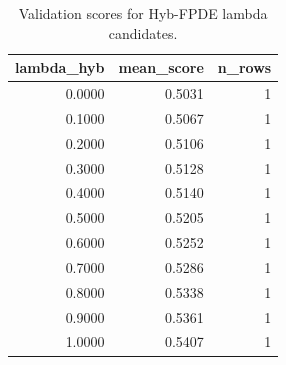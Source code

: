 \begin{table}[t]
\caption{Validation scores for Hyb-FPDE lambda candidates.}
\label{tab:lambda_distribution_computed}
\centering
\begin{tabular}{rrr}
\toprule
lambda\_hyb & mean\_score & n\_rows \\
\midrule
0.0000 & 0.5031 & 1 \\
0.1000 & 0.5067 & 1 \\
0.2000 & 0.5106 & 1 \\
0.3000 & 0.5128 & 1 \\
0.4000 & 0.5140 & 1 \\
0.5000 & 0.5205 & 1 \\
0.6000 & 0.5252 & 1 \\
0.7000 & 0.5286 & 1 \\
0.8000 & 0.5338 & 1 \\
0.9000 & 0.5361 & 1 \\
1.0000 & 0.5407 & 1 \\
\bottomrule
\end{tabular}

\end{table}
